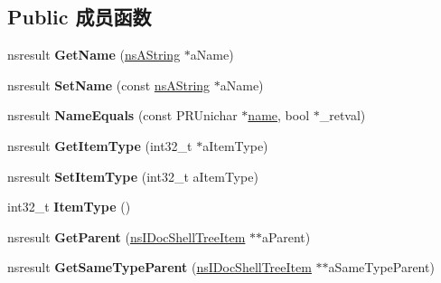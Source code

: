 \subsection*{Public 成员函数}
\begin{DoxyCompactItemize}
\item 
\mbox{\label{interfacens_i_doc_shell_tree_item_ad0f710b3a8c002e69de036fce73cc1b5}} 
nsresult {\bfseries Get\+Name} (\hyperlink{structns_string_container}{ns\+A\+String} $\ast$a\+Name)
\item 
\mbox{\label{interfacens_i_doc_shell_tree_item_a02df137585a11fd7c5f355d3c7153c9f}} 
nsresult {\bfseries Set\+Name} (const \hyperlink{structns_string_container}{ns\+A\+String} $\ast$a\+Name)
\item 
\mbox{\label{interfacens_i_doc_shell_tree_item_acbbb56c69ab4ec7280dbbf718596b54d}} 
nsresult {\bfseries Name\+Equals} (const P\+R\+Unichar $\ast$\hyperlink{structname}{name}, bool $\ast$\+\_\+retval)
\item 
\mbox{\label{interfacens_i_doc_shell_tree_item_acf52a3172a43eb7dacdc72d8067f1d69}} 
nsresult {\bfseries Get\+Item\+Type} (int32\+\_\+t $\ast$a\+Item\+Type)
\item 
\mbox{\label{interfacens_i_doc_shell_tree_item_a53c98ec5ec6b28674c22befec1a6c4c1}} 
nsresult {\bfseries Set\+Item\+Type} (int32\+\_\+t a\+Item\+Type)
\item 
\mbox{\label{interfacens_i_doc_shell_tree_item_a2891f4b6bf410d6830762c113024d030}} 
int32\+\_\+t {\bfseries Item\+Type} ()
\item 
\mbox{\label{interfacens_i_doc_shell_tree_item_a0b3bc97209a2e4e76cb63863de2982b0}} 
nsresult {\bfseries Get\+Parent} (\hyperlink{interfacens_i_doc_shell_tree_item}{ns\+I\+Doc\+Shell\+Tree\+Item} $\ast$$\ast$a\+Parent)
\item 
\mbox{\label{interfacens_i_doc_shell_tree_item_afcad8ed4e1ff5fc8a86810dcf8f70c5e}} 
nsresult {\bfseries Get\+Same\+Type\+Parent} (\hyperlink{interfacens_i_doc_shell_tree_item}{ns\+I\+Doc\+Shell\+Tree\+Item} $\ast$$\ast$a\+Same\+Type\+Parent)

\end{DoxyCompactItemize}
